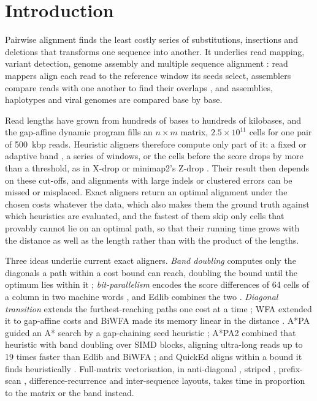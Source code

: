 \section{Introduction}

Pairwise alignment finds the least costly series of substitutions, insertions and deletions that transforms one sequence into another. It underlies read mapping, variant detection, genome assembly and multiple sequence alignment \citep{Prjibelski2019sequence}: read mappers align each read to the reference window its seeds select, assemblers compare reads with one another to find their overlaps \citep{Li2018minimap2}, and assemblies, haplotypes and viral genomes are compared base by base.

Read lengths have grown from hundreds of bases to hundreds of kilobases, and the gap-affine dynamic program \citep{Gotoh1982} fills an \(n \times m\) matrix, \(2.5 \times 10^{11}\) cells for one pair of 500~kbp reads. Heuristic aligners therefore compute only part of it: a fixed or adaptive band \citep{Liu2023blockaligner}, a series of windows, or the cells before the score drops by more than a threshold, as in X-drop or minimap2's Z-drop \citep{Li2018minimap2}. Their result then depends on these cut-offs, and alignments with large indels or clustered errors can be missed or misplaced. Exact aligners return an optimal alignment under the chosen costs whatever the data, which also makes them the ground truth against which heuristics are evaluated, and the fastest of them skip only cells that provably cannot lie on an optimal path, so that their running time grows with the distance as well as the length rather than with the product of the lengths.

Three ideas underlie current exact aligners. \emph{Band doubling} computes only the diagonals a path within a cost bound can reach, doubling the bound until the optimum lies within it \citep{Ukkonen1985}; \emph{bit-parallelism} encodes the score differences of 64 cells of a column in two machine words \citep{Myers1999bitvector}, and Edlib combines the two \citep{Sosic2017edlib}. \emph{Diagonal transition} extends the furthest-reaching paths one cost at a time \citep{Ukkonen1985,Myers1986ond}; WFA extended it to gap-affine costs \citep{MarcoSola2021wfa} and BiWFA made its memory linear in the distance \citep{MarcoSola2023biwfa}. A*PA guided an A* search by a gap-chaining seed heuristic \citep{GrootKoerkamp2024astarpa}; A*PA2 combined that heuristic with band doubling over SIMD blocks, aligning ultra-long reads up to 19 times faster than Edlib and BiWFA \citep{GrootKoerkamp2024astarpa2}; and QuickEd aligns within a bound it finds heuristically \citep{Doblas2025quicked}. Full-matrix vectorisation, in anti-diagonal \citep{Wozniak1997}, striped \citep{Farrar2007striped,Zhao2013ssw}, prefix-scan \citep{Daily2016parasail}, difference-recurrence \citep{Suzuki2018diff,Li2018minimap2} and inter-sequence \citep{Rognes2011swipe,Rahn2018seqan} layouts, takes time in proportion to the matrix or the band instead.

